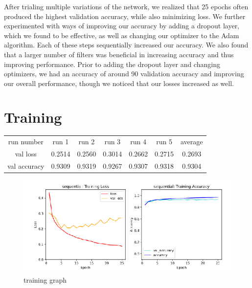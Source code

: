 \documentclass[11pt]{article}
\begin{document}
After trialing multiple variations of the network, we realized that 25 epochs often
produced the highest validation accuracy, while also minimizing loss. We further
experimented with ways of improving our accuracy by adding a dropout layer, which
we found to be effective, as well as changing our optimizer to the Adam algorithm.
Each of these steps sequentially increased our accuracy. We also found that a larger
number of filters was beneficial in increasing accuracy and thus improving performance.
Prior to adding the dropout layer and changing optimizers, we had an accuracy of
around 90%
validation accuracy and improving our overall performance, though we noticed that
our losses increased as well.


\section{Training}



\begin{center}
\begin{tabular}{ |c|c|c|c|c|c|c| }
 \hline
 run number & run 1 & run 2  & run 3 & run 4 & run 5 & average \\
 val loss & 0.2514 & 0.2560 & 0.3014 & 0.2662 & 0.2715 & 0.2693 \\
 val accuracy & 0.9309 & 0.9319 & 0.9267 & 0.9307 & 0.9318 & 0.9304 \\
 \hline
\end{tabular}
\end{center}

\begin{figure}
    \includegraphics[width=\linewidth]{adam.png}
    \caption{training graph}
    \label{fig:training graph}
\end{figure}
\end{document}
